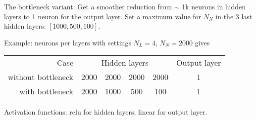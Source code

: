 \begin{frame}
\manip The \og bottleneck \fg{} variant:
\submanip Get a smoother reduction from $\sim$ 1k neurons in hidden layers to 1 neuron for the output layer.
\submanip Set a maximum value for $N_N$ in the 3 last hidden layers: $[1000, 500, 100]$.

\vfill
\manip Example: neurons per layers with settings $N_L = 4$, $N_N=2000$ gives
\begin{center}
\begin{tabular}{rccccc}
Case & \multicolumn{4}{c}{Hidden layers} & Output layer \\
without bottleneck & 2000 & 2000 & 2000 & 2000 & 1\\
with bottleneck & 2000 & 1000 & 500 & 100 & 1
\end{tabular}
\end{center}
\end{frame}

\begin{frame}
\manip Activation functions:
\submanip relu for hidden layers;
\submanip linear for output layer.
\end{frame}